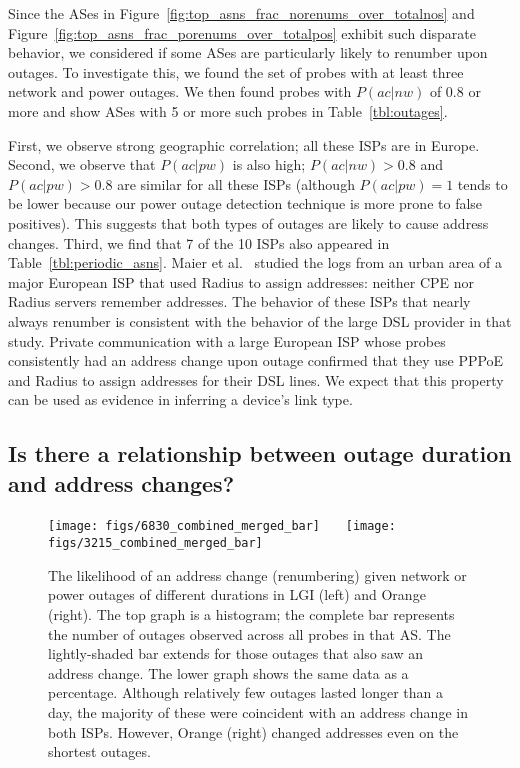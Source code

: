 Since the ASes in
Figure~\ref{fig:top_asns_frac_norenums_over_totalnos} and
Figure~\ref{fig:top_asns_frac_porenums_over_totalpos} exhibit such
disparate behavior, we considered if some ASes are particularly likely
to renumber upon outages. To investigate this, we found the set of
probes with at least three network and power outages. We then found
probes with $P(ac|nw)$ of 0.8 or more and show ASes with 5 or more
such probes in Table~\ref{tbl:outages}.

First, we observe strong geographic correlation; all these ISPs are in
Europe. Second, we observe that $P(ac|pw)$ is also high; $P(ac|nw) >
0.8$ and $P(ac|pw) > 0.8$ are similar for all these ISPs (although
$P(ac|pw) = 1$ tends to be lower because our power outage detection
technique is more prone to false positives). This suggests that both
types of outages are likely to cause address changes. Third, we find
that 7 of the 10 ISPs also appeared in Table~\ref{tbl:periodic_asns}.
Maier et al.~\cite{maier2009dominant} studied the logs from an urban
area of a major European ISP that used Radius to assign addresses:
neither CPE nor Radius servers remember addresses.  The behavior of
these ISPs that nearly always renumber is consistent with the behavior
of the large DSL provider in that study. Private communication with a
large European ISP whose probes consistently had an address change
upon outage confirmed that they use PPPoE and Radius to assign
addresses for their DSL lines. We expect that this property can be
used as evidence in inferring a device's link type.


\subsection{Is there a relationship between outage duration and
  address changes?}
\label{sec:outage_durs}
\begin{figure}[t]
  \texttt{[image: figs/6830\_combined\_merged\_bar]}~~~
  \texttt{[image: figs/3215\_combined\_merged\_bar]}

  \caption{\label{fig:outagedurs} The likelihood of an address change (renumbering)
    given network or power outages of different durations in LGI (left)
    and Orange (right).  The top graph is a histogram; the
    complete bar represents the number of outages observed
    across all probes in that AS.  The lightly-shaded bar
    extends for those outages that also saw an address
    change.  The lower graph shows the same data as a
    percentage.  Although relatively few outages
    lasted longer than a day, the majority of these were
    coincident with an address change in both ISPs. However,
    Orange (right) changed addresses even on the shortest
    outages.}
\end{figure}

